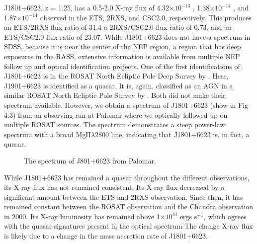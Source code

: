 J1801+6623, z = 1.25, has a 0.5-2.0 X-ray flux of 4.32$\times 10^{-13}$ \fluxunits, 1.38$\times 10^{-14}$ \fluxunits, and 1.87$\times 10^{-14}$ \fluxunits observed in the ETS, 2RXS, and CSC2.0, respectively.
This produces an ETS/2RXS flux ratio of 31.4 a 2RXS/CSC2.0 flux ratio of 0.73, and an ETS/CSC2.0 flux ratio of 23.07.
While J1801+6623 does not have a spectrum in SDSS, because it is near the center of the NEP region, a region that has deep exposures in the RASS, extensive information is available from multiple NEP follow up and optical identification projects. 
One of the first identifications of J1801+6623 is in the ROSAT North Ecliptic Pole Deep Survey by \cite{bower1996}. 
Here, J1901+6623 is identified as a quasar. 
It is, again, classified as an AGN in a similar ROSAT North Ecliptic Pole Survey by \cite{henry2006}. 
Both did not make their spectrum available. 
However, we obtain a spectrum of J1801+6623 (show in Fig 4.3) from an observing run at Palomar where we optically followed up on multiple ROSAT sources. 
The spectrum demonstrates a steep power-law spectrum with a broad MgII$\lambda 2800$ line, indicating that J1801+6623 is, in fact, a quasar.

\begin{figure}[h]
\centering
{}
\caption{The spectrum of J801+6623 from Palomar.}
\label{imbeded_fb}
\end{figure}

While J1801+6623 has remained a quasar throughout the different observations, its X-ray flux has not remained consistent. 
Its X-ray flux decreased by a significant amount between the ETS and 2RXS observation.
Since then, it has remained constant between the ROSAT observation and the Chandra observation in 2000.
Its X-ray luminosity has remained above 1$\times 10^{44}$ ergs s$^{-1}$, which agrees with the quasar signatures present in the optical spectrum
The change X-ray flux is likely due to a change in the mass accretion rate of J1801+6623.



